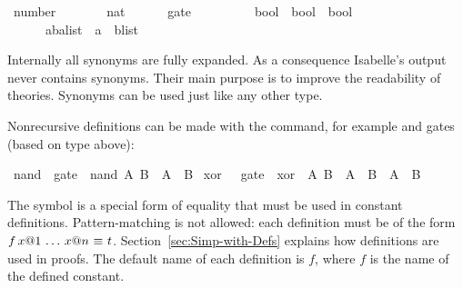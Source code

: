 %
\begin{isabellebody}%
\def\isabellecontext{types}%
%
\isadelimtheory
%
\endisadelimtheory
%
\isatagtheory
%
\endisatagtheory
{\isafoldtheory}%
%
\isadelimtheory
%
\endisadelimtheory
{}\isamarkupfalse%
\ number\ \ \ \ \ \ \ {\isacharequal}\ nat\isanewline
\ \ \ \ \ \ gate\ \ \ \ \ \ \ \ \ {\isacharequal}\ {\isachardoublequoteopen}bool\ {\isasymRightarrow}\ bool\ {\isasymRightarrow}\ bool{\isachardoublequoteclose}\isanewline
\ \ \ \ \ \ {\isacharparenleft}{\isacharprime}a{\isacharcomma}{\isacharprime}b{\isacharparenright}alist\ {\isacharequal}\ {\isachardoublequoteopen}{\isacharparenleft}{\isacharprime}a\ {\isasymtimes}\ {\isacharprime}b{\isacharparenright}list{\isachardoublequoteclose}%
\begin{isamarkuptext}%
\noindent
Internally all synonyms are fully expanded.  As a consequence Isabelle's
output never contains synonyms.  Their main purpose is to improve the
readability of theories.  Synonyms can be used just like any other
type.%
\end{isamarkuptext}%
\isamarkuptrue%
%
\isamarkuptrue%
%
\begin{isamarkuptext}%
\label{sec:ConstDefinitions}%
Nonrecursive definitions can be made with the 
command, for example  and  gates
(based on type  above):%
\end{isamarkuptext}%
\isamarkuptrue%
\isamarkupfalse%
\ nand\ {\isacharcolon}{\isacharcolon}\ gate\ \ {\isachardoublequoteopen}nand\ A\ B\ {\isasymequiv}\ {\isasymnot}{\isacharparenleft}A\ {\isasymand}\ B{\isacharparenright}{\isachardoublequoteclose}\isanewline
{}\isamarkupfalse%
\ xor\ \ {\isacharcolon}{\isacharcolon}\ gate\ \ {\isachardoublequoteopen}xor\ \ A\ B\ {\isasymequiv}\ A\ {\isasymand}\ {\isasymnot}B\ {\isasymor}\ {\isasymnot}A\ {\isasymand}\ B{\isachardoublequoteclose}%
\begin{isamarkuptext}%
\noindent%
The symbol  is a special form of equality
that must be used in constant definitions.
Pattern-matching is not allowed: each definition must be of
the form $f\,x@1\,\dots\,x@n~\emph{$\equiv$}~t$.
Section~\ref{sec:Simp-with-Defs} explains how definitions are used
in proofs. The default name of each definition is $f$, where
$f$ is the name of the defined constant.%
\end{isamarkuptext}%
\isamarkuptrue%
%
\isadelimtheory
%
\endisadelimtheory
%
\isatagtheory
%
\endisatagtheory
{\isafoldtheory}%
%
\isadelimtheory
%
\endisadelimtheory
\end{isabellebody}%
